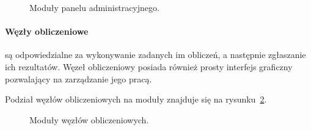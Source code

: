 \documentclass[a4paper,11pt,twoside]{report}
\theoremstyle{definition}
\begin{document}
\begin{figure} 
    \caption{Moduły panelu administracyjnego.}
    \label{admin-panel-model}
\end{figure}

\paragraph{Węzły obliczeniowe}

są odpowiedzialne za wykonywanie zadanych im obliczeń, a następnie zgłaszanie ich rezultatów. Węzeł obliczeniowy posiada również prosty interfejs graficzny pozwalający na zarządzanie jego pracą.

Podział węzłów obliczeniowych na moduły znajduje się na rysunku~\ref{node-model}.

\begin{figure} 
    \caption{Moduły węzłów obliczeniowych.}
    \label{node-model}
\end{figure}
\end{document}

